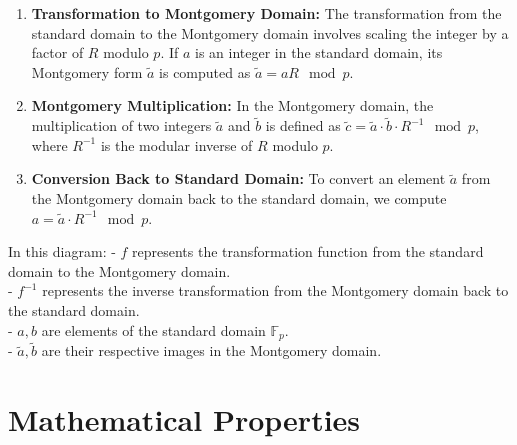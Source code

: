 \begin{enumerate}
	\item \textbf{Transformation to Montgomery Domain:} The transformation from the standard domain to the Montgomery domain involves scaling the integer by a factor of $R$ modulo $p$. If $a$ is an integer in the standard domain, its Montgomery form $\widetilde{a}$ is computed as $\widetilde{a} = aR \mod p$.
	\item \textbf{Montgomery Multiplication:} In the Montgomery domain, the multiplication of two integers $\widetilde{a}$ and $\widetilde{b}$ is defined as $\widetilde{c} = \widetilde{a} \cdot \widetilde{b} \cdot R^{-1} \mod p$, where $R^{-1}$ is the modular inverse of $R$ modulo $p$.
	\item \textbf{Conversion Back to Standard Domain:} To convert an element $\widetilde{a}$ from the Montgomery domain back to the standard domain, we compute $a = \widetilde{a} \cdot R^{-1} \mod p$.
\end{enumerate}

\begin{center}
\end{center}


In this diagram:
- $f$ represents the transformation function from the standard domain to the Montgomery domain.\\
- $f^{-1}$ represents the inverse transformation from the Montgomery domain back to the standard domain.\\
- $a, b$ are elements of the standard domain $\mathbb{F}_p$.\\
- $\widetilde{a}, \widetilde{b}$ are their respective images in the Montgomery domain.

\section*{Mathematical Properties}

